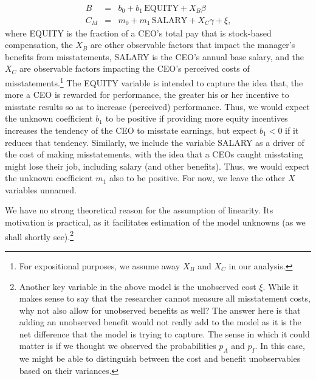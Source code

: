\documentclass[12pt,reqno,titlepage]{amsart}
\theoremstyle{definition}
\begin{document}
\begin{doublespace}
\begin{equation}
\begin{array}{lcl}\label{eqns1}
B & = & b_0 + b_1 \, \mbox{EQUITY} + X_B\beta\\[.5em]
C_M & = & m_0 + m_1 \, \mbox{SALARY} + X_C\gamma + \xi \text{,} %
\end{array}
\end{equation}
where EQUITY is the fraction of a CEO's total pay that is stock-based compensation, 
the $X_B$ are other observable factors that impact the manager's benefits from misstatements,
SALARY is the CEO's annual base salary, and the $X_C$ are observable factors impacting the CEO's perceived costs of misstatements.\footnote{
For expositional purposes, we assume away $X_B$ and $X_C$ in our analysis.}
The EQUITY variable is intended to capture the idea that, the more a CEO is rewarded for performance, the greater his or her incentive to misstate results so as to increase (perceived) performance.
Thus, we would expect the unknown coefficient $b_1$ to be positive if providing more equity incentives increases the tendency of the CEO to misstate earnings, but expect $b_1 < 0$ if it reduces that tendency.
Similarly, we include the variable SALARY as a driver of the cost of making misstatements, with the idea that a CEOs caught misstating might lose their job, including salary (and other benefits).
Thus, we would expect the unknown coefficient $m_1$ also to be positive.
For now, we leave the other $X$ variables unnamed.

We have no strong theoretical reason for the assumption of linearity. Its motivation is practical, as it facilitates estimation of the model unknowns (as we shall shortly see).\footnote{Another key variable in the above model is the unobserved cost $\xi$.
While it makes sense to say that the researcher cannot measure all misstatement costs, why not also allow for unobserved benefits as well?
The answer here is that adding an unobserved benefit would not really add to the model as it is the net difference that the model is trying to capture.
The sense in which it could matter is if we thought we observed the probabilities $p_A$ and $p_I$.
In this case, we might be able to distinguish between the cost and benefit unobservables based on their variances.}
 

\end{doublespace}
\end{document}
